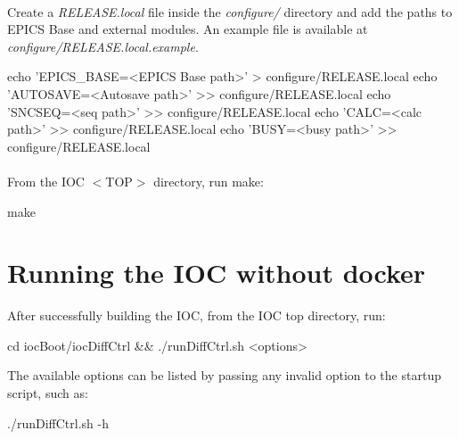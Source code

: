 \documentclass[openany]{article}
\begin{document}
        \paragraph{} Create a \emph{RELEASE.local} file inside the \emph{configure/} directory and add the paths to EPICS Base and external modules. An example file is available at \emph{configure/RELEASE.local.example}.

            \vspace{1mm}
            \begin{code}
echo 'EPICS_BASE=<EPICS Base path>' > configure/RELEASE.local
echo 'AUTOSAVE=<Autosave path>' >> configure/RELEASE.local
echo 'SNCSEQ=<seq path>' >> configure/RELEASE.local
echo 'CALC=<calc path>' >> configure/RELEASE.local
echo 'BUSY=<busy path>' >> configure/RELEASE.local
            \end{code}
            \vspace{1mm}

        \paragraph{} From the IOC $<$TOP$>$ directory, run make:

            \vspace{1mm}
            \begin{code}
make
            \end{code}
            \vspace{1mm}

\section{Running the IOC without docker}

    After successfully building the IOC, from the IOC top directory, run:

        \vspace{1mm}
        \begin{code}
cd iocBoot/iocDiffCtrl &&
./runDiffCtrl.sh <options>
        \end{code}
        \vspace{1mm}

    The available options can be listed by passing any invalid option to the startup script, such as:

        \vspace{1mm}
        \begin{code}
./runDiffCtrl.sh -h
        \end{code}
        \vspace{1mm}
\end{document}
